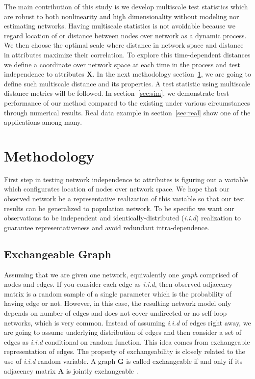 \documentclass[12pt]{article}
\theoremstyle{definition}
\begin{document}
The main contribution of this study is we develop multiscale test statistics which are robust to both nonlinearity and high dimensionality without modeling nor estimating networks. Having multiscale statistics is not avoidable because we regard location of or distance between nodes over network as a dynamic process. We then choose the optimal scale where distance in network space and distance in attributes maximize their correlation. To explore this time-dependent distances we define a coordinate over network space at each time in the process and test independence to attributes $\mathbf{X}$. In the next methodology section~\ref{sec:method}, we are going to define such multiscale distance and its properties. A test statistic using multiscale distance metrics will be followed. In section~\ref{sec:sim}, we demonstrate best performance of our method compared to the existing under various circumstances through numerical results. Real data example in section~\ref{sec:real} show one of the applications among many.  
	
	
\bigskip
\section{Methodology}
\label{sec:method}
	
First step in testing network independence to attributes is figuring out a variable which configurates location of nodes over network space. We hope that our observed network be a representative realization of this variable so that our test results can be generalized to population network. To be specific we want our observations to be independent and identically-distributed (\textit{i.i.d}) realization to guarantee representativeness and avoid redundant intra-dependence.  
	
\subsection{Exchangeable Graph}
	
Assuming that we are given one network, equivalently one \textit{graph} comprised of nodes and edges. If you consider each edge as \textit{i.i.d}, then observed adjacency matrix is a random sample of a single parameter which is the probability of having edge or not. However, in this case, the resulting network model only depends on number of edges \citep{orbanz2015bayesian} and does not cover undirected or no self-loop networks, which is very common. Instead of assuming \textit{i.i.d} of edges right away, we are going to assume underlying distribution of edges and then consider a set of edges as \textit{i.i.d} conditional on random function. This idea comes from exchangeable representation of edges.
The property of exchangeability is closely related to the use of \textit{i.i.d} random variable. A graph $\mathbf{G}$ is called exchangeable if and only if its adjacency matrix $\mathbf{A}$ is jointly exchangeable \citep{orbanz2015bayesian}. 
	
\end{document}

